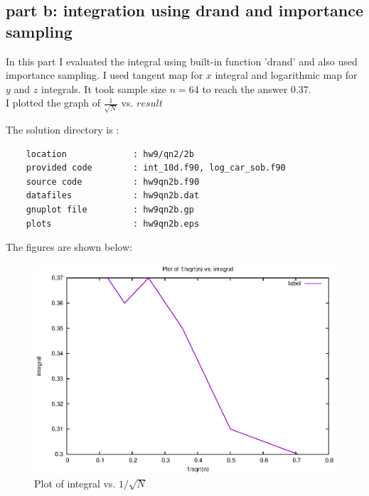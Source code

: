 \documentclass[11pt,a4paper,english]{article}
\begin{document}
\subsection{part b: integration using drand and importance sampling}
In this part I evaluated the integral using built-in function 'drand' and also used
importance sampling. I used tangent map for $x$ integral and logarithmic map
for $y$ and $z$ integrals.
It took sample size $n=64$ to reach the answer $0.37$.\\
I plotted the graph of $\frac{1}{\sqrt{N}}$ vs. $result$

			The solution directory is :\\
	\begin{verbatim}
	location             : hw9/qn2/2b
	provided code        : int_10d.f90, log_car_sob.f90
	source code          : hw9qn2b.f90
	datafiles            : hw9qn2b.dat
	gnuplot file         : hw9qn2b.gp
	plots                : hw9qn2b.eps
	\end{verbatim}
	
		    The figures are shown below:\\
	\begin{figure}[h!]
	\centering
	\includegraphics [scale=0.6]{figures/hw9qn2b.eps}
	\caption{Plot of integral vs. $1/\sqrt{N}$ }
	\end{figure}
	\clearpage

\end{document}

